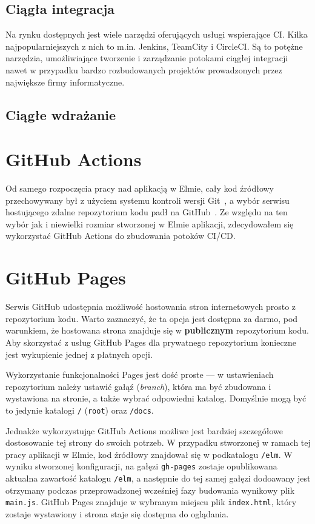 \documentclass[twoside,a4paper]{report}
\begin{document}
\subsection{Ciągła integracja}

Na rynku dostępnych jest wiele narzędzi oferujących usługi wspierające CI\@. Kilka najpopularniejszych z nich to m.in. Jenkins, TeamCity i CircleCI\@.
Są to potężne narzędzia, umożliwiające tworzenie i zarządzanie potokami ciągłej integracji nawet w przypadku bardzo rozbudowanych projektów prowadzonych przez największe firmy informatyczne.
\subsection{Ciągłe wdrażanie}

\section{GitHub Actions}
Od samego rozpoczęcia pracy nad aplikacją w Elmie, cały kod źródłowy przechowywany był z użyciem systemu kontroli wersji Git~\cite{git}, a wybór serwisu hostującego zdalne repozytorium kodu padł na GitHub~\cite{github}. Ze względu na ten wybór jak i niewielki rozmiar stworzonej w Elmie aplikacji, zdecydowałem się wykorzystać GitHub Actions do zbudowania potoków CI/CD\@.


\section{GitHub Pages}
Serwis GitHub udostępnia możliwość hostowania stron internetowych prosto z repozytorium kodu. Warto zaznaczyć, że ta opcja jest dostępna za darmo, pod warunkiem, że hostowana strona znajduje się w \textbf{publicznym} repozytorium kodu. Aby skorzystać z usług GitHub Pages dla prywatnego repozytorium konieczne jest wykupienie jednej z płatnych opcji.

Wykorzystanie funkcjonalności Pages jest dość proste --- w ustawieniach repozytorium należy ustawić gałąź (\textit{branch}), która ma być zbudowana i wystawiona na stronie, a także wybrać odpowiedni katalog.
Domyślnie mogą być to jedynie katalogi \texttt{/} (\texttt{root}) oraz \texttt{/docs}.

Jednakże wykorzystując GitHub Actions możliwe jest bardziej szczegółowe dostosowanie tej strony do swoich potrzeb.
W przypadku stworzonej w ramach tej pracy aplikacji w Elmie, kod źródłowy znajdował się w podkatalogu \texttt{/elm}.
W wyniku stworzonej konfiguracji, na gałęzi \texttt{gh-pages} zostaje opublikowana aktualna zawartość katalogu \texttt{/elm}, a następnie do tej samej gałęzi dodoawany jest otrzymany podczas przeprowadzonej wcześniej fazy budowania wynikowy plik \texttt{main.js}.
GitHub Pages znajduje w wybranym miejscu plik \texttt{index.html}, który zostaje wystawiony i strona staje się dostępna do oglądania.
\end{document}
